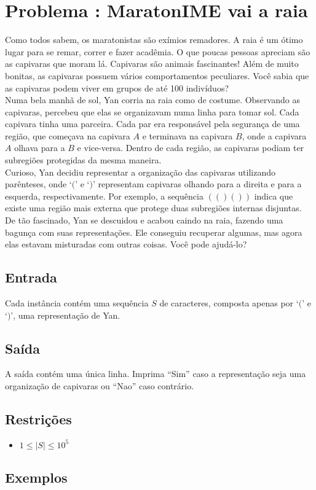 \section*{Problema \proxLetra: MaratonIME vai a raia}

Como todos sabem, os maratonistas são exímios remadores. A raia é um ótimo lugar para se remar, correr e fazer acadêmia. O que poucas pessoas apreciam são as capivaras que moram lá. Capivaras são animais fascinantes! Além de muito bonitas, as capivaras possuem vários comportamentos peculiares. Você sabia que as capivaras podem viver em grupos de até 100 indivíduos?\\
Numa bela manhã de sol, Yan corria na raia como de costume. Observando as capivaras, percebeu que elas se organizavam numa linha para tomar sol. Cada capivara tinha uma parceira. Cada par era responsável pela segurança de uma região, que começava na capivara $A$ e terminava na capivara $B$, onde a capivara $A$ olhava para a $B$ e vice-versa. Dentro de cada região, as capivaras podiam ter subregiões protegidas da mesma maneira.\\
Curioso, Yan decidiu representar a organização das capivaras utilizando parênteses, onde `$($' e `$)$' representam capivaras olhando para a direita e para a esquerda, respectivamente. Por exemplo, a sequência $(()())$ indica que existe uma região mais externa que protege duas subregiões internas disjuntas. De tão fascinado, Yan se descuidou e acabou caindo na raia, fazendo uma bagunça com suas representações. Ele conseguiu recuperar algumas, mas agora elas estavam misturadas com outras coisas. Você pode ajudá-lo?

\subsection*{Entrada}
\textoDiversasInstanciasEOF

Cada instância contém uma sequência $S$ de caracteres, composta apenas por `$($' e `$)$', uma representação de Yan.

\subsection*{Saída}

A saída contém uma única linha. Imprima ``Sim'' caso a representação seja uma organização de capivaras ou ``Nao'' caso contrário.


\subsection*{Restrições}
\begin{itemize}
  \item $1 \leq |S| \leq 10^5$
\end{itemize}

\subsection*{Exemplos}

